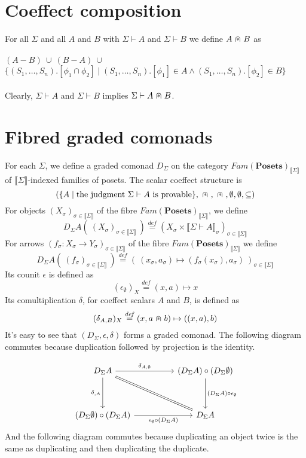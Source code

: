 \documentclass{article}
\newcommand{\mbf}{\mathbf}
\newcommand{\sem}[1]{\llbracket #1 \rrbracket}
\newcommand{\defeq}{\overset{\mathit{def}}{=}}
\newcommand{\capdot}{~\stackinset{c}{}{c}{}{\scalebox{0.8}{$\ast$}}{$\cap$}~}
\begin{document}
\section*{Coeffect composition}

For all $\Sigma$ and all $A$ and $B$ with $\Sigma \vdash A$ and $\Sigma \vdash B$ we define $A \capdot B$ as\\~\\
$(A - B)~\cup~(B - A)~\cup$\\
$\{ (S_1,\ldots,S_n).[\phi_1 \cap \phi_2] \mid (S_1,\ldots,S_n).[\phi_1] \in A \wedge (S_1,\ldots,S_n).[\phi_2] \in B \}$ \\~\\
Clearly, $\Sigma \vdash A$ and $\Sigma \vdash B$ implies $\Sigma \vdash A \capdot B$. 
\section*{Fibred graded comonads}
 
For each $\Sigma$, we define a graded comonad $D_{\Sigma}$ on the category $\mathit{Fam}(\mbf{Posets})_{\sem{\Sigma}}$ of $\sem{\Sigma}$-indexed families of posets. The scalar coeffect structure is $$( \{ A \mid \text{the judgment } \Sigma \vdash A \text{ is provable} \}, \capdot, \capdot, \emptyset, \emptyset, \subseteq)$$ For objects $(X_\sigma)_{\sigma \in \sem{\Sigma}}$ of the fibre $\mathit{Fam}(\mbf{Posets})_{\sem{\Sigma}}$, we define $$D_{\Sigma} A(~(X_\sigma)_{\sigma \in \sem{\Sigma}}~) \defeq (X_\sigma \times \sem{\Sigma \vdash A}_\sigma)_{\sigma \in \sem{\Sigma}}$$ For arrows $(f_\sigma : X_\sigma \to Y_\sigma)_{\sigma \in \sem{\Sigma}}$ of the fibre $\mathit{Fam}(\mbf{Posets})_{\sem{\Sigma}}$ we define $$D_{\Sigma} A(~(f_\sigma)_{\sigma \in \sem{\Sigma}}~) \defeq (~(x_\sigma, a_\sigma) \mapsto (f_\sigma(x_\sigma),a_\sigma)~)_{\sigma \in \sem{\Sigma}}$$ Its counit $\epsilon$ is defined as $$(\epsilon_{\emptyset})_X \defeq (x,a) \mapsto x
$$ Its comultiplication $\delta$, for coeffect scalars $A$ and $B$, is defined as $$(\delta_{A,B})_X \defeq (x,a \capdot b) \mapsto ((x, a), b)$$ 
It's easy to see that $(D_{\Sigma}, \epsilon, \delta)$ forms a graded comonad. The following diagram commutes because duplication followed by projection is the identity.

\[\begin{tikzcd}
	{D_{\Sigma} A} && {(D_{\Sigma} A) \circ (D_{\Sigma} \emptyset)} \\
	\\
	{(D_{\Sigma} \emptyset) \circ (D_{\Sigma} A)} && {D_{\Sigma} A}
	\arrow["{\delta_{\empty,A}}"', from=1-1, to=3-1]
	\arrow["{\epsilon_{\emptyset} \circ (D_{\Sigma} A)}"', from=3-1, to=3-3]
	\arrow["{\delta_{A, \emptyset}}", from=1-1, to=1-3]
	\arrow["{(D_{\Sigma} A) \circ \epsilon_{\emptyset}}", from=1-3, to=3-3]
	\arrow[no head, equals, from=1-1, to=3-3]
\end{tikzcd}\]
And the following diagram commutes because duplicating an object twice is the same as duplicating and then duplicating the duplicate.
\end{document}
